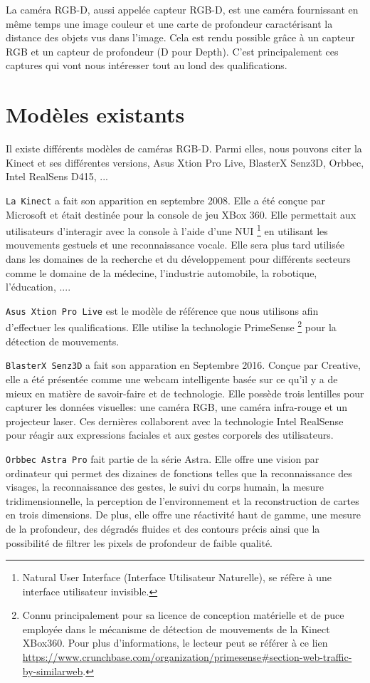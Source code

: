 \documentclass[a4paper, 12pt]{book}
\begin{document}
La caméra RGB-D, aussi appelée capteur RGB-D, est une caméra fournissant en même temps une image couleur et une carte de profondeur caractérisant la distance des objets vus dans l'image. Cela est rendu possible grâce à un capteur RGB et un capteur de profondeur (D pour Depth). C'est principalement ces captures qui vont nous intéresser tout au lond des qualifications.


\section{Modèles existants}
Il existe différents modèles de caméras RGB-D. Parmi elles, nous pouvons citer la Kinect et ses différentes versions, Asus Xtion Pro Live, BlasterX Senz3D, Orbbec, Intel RealSens D415, ...
\par \texttt{La Kinect} a fait son apparition en septembre 2008. Elle a été conçue par Microsoft et était destinée pour la console de jeu XBox 360. Elle permettait aux utilisateurs d'interagir avec la console à l'aide d'une NUI \footnote{Natural User Interface (Interface Utilisateur Naturelle), se réfère à une interface utilisateur invisible.} en utilisant les mouvements gestuels et une reconnaissance vocale. Elle sera plus tard utilisée dans les domaines de la  recherche et du développement pour différents secteurs comme le domaine de la médecine, l'industrie automobile, la robotique, l'éducation,  .... 
\par \texttt{Asus Xtion Pro Live} est le modèle de référence que nous utilisons afin d'effectuer les qualifications. Elle utilise la technologie PrimeSense  \footnote{Connu principalement pour sa licence de conception matérielle et de puce employée dans le mécanisme de détection de mouvements de la Kinect XBox360. Pour plus d'informations, le lecteur peut se référer à ce lien \url{https://www.crunchbase.com/organization/primesense#section-web-traffic-by-similarweb}.} pour la détection de mouvements.
\par \texttt{BlasterX Senz3D} a fait son apparation en Septembre 2016. Conçue par Creative,  elle a été présentée comme une webcam intelligente basée sur ce qu'il y a de mieux en matière de savoir-faire et de technologie. Elle possède trois lentilles pour capturer les données visuelles: une caméra RGB, une caméra infra-rouge et un projecteur laser. Ces dernières collaborent avec la technologie Intel RealSense pour réagir aux expressions faciales et aux gestes corporels des utilisateurs.
\par \texttt{Orbbec Astra Pro} fait partie de la série Astra. Elle offre une vision par ordinateur qui permet des dizaines de fonctions telles que la reconnaissance des visages, la reconnaissance des gestes, le suivi du corps humain, la mesure tridimensionnelle, la perception de l'environnement et la reconstruction de cartes en trois dimensions. De plus, elle offre une réactivité haut de gamme, une mesure de la profondeur, des dégradés fluides et des contours précis ainsi que la possibilité de filtrer les pixels de profondeur de faible qualité.
\end{document}
